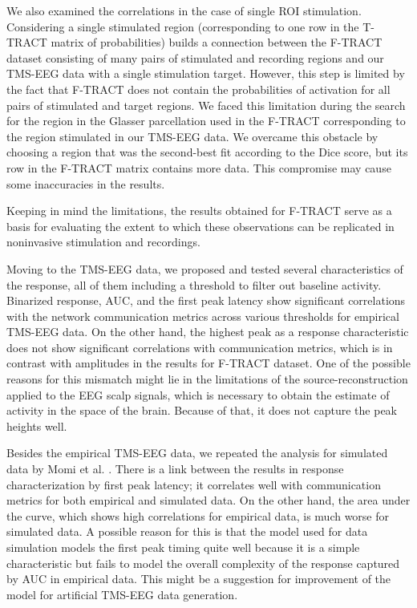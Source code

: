 We also examined the correlations in the case of single ROI stimulation. Considering a single stimulated region (corresponding to one row in the T-TRACT matrix of probabilities) builds a connection between the F-TRACT dataset consisting of many pairs of stimulated and recording regions and our TMS-EEG data with a single stimulation target. However, this step is limited by the fact that F-TRACT does not contain the probabilities of activation for all pairs of stimulated and target regions. We faced this limitation during the search for the region in the Glasser parcellation used in the F-TRACT corresponding to the region stimulated in our TMS-EEG data. We overcame this obstacle by choosing a region that was the second-best fit according to the Dice score, but its row in the F-TRACT matrix contains more data. This compromise may cause some inaccuracies in the results.

Keeping in mind the limitations, the results obtained for F-TRACT serve as a basis for evaluating the extent to which these observations can be replicated in noninvasive stimulation and recordings. 

Moving to the TMS-EEG data, we proposed and tested several characteristics of the response, all of them including a threshold to filter out baseline activity. Binarized response, AUC, and the first peak latency show significant correlations with the network communication metrics across various thresholds for empirical TMS-EEG data. On the other hand, the highest peak as a response characteristic does not show significant correlations with communication metrics, which is in contrast with amplitudes in the results for F-TRACT dataset. One of the possible reasons for this mismatch might lie in the limitations of the source-reconstruction applied to the EEG scalp signals, which is necessary to obtain the estimate of activity in the space of the brain. Because of that, it does not capture the peak heights well.

Besides the empirical TMS-EEG data, we repeated the analysis for simulated data by Momi et al. \cite{momi_tms-evoked_2023}. There is a link between the results in response characterization by first peak latency; it correlates well with communication metrics for both empirical and simulated data. On the other hand, the area under the curve, which shows high correlations for empirical data, is much worse for simulated data. A possible reason for this is that the model used for data simulation models the first peak timing quite well because it is a simple characteristic but fails to model the overall complexity of the response captured by AUC in empirical data. This might be a suggestion for improvement of the model for artificial TMS-EEG data generation.

